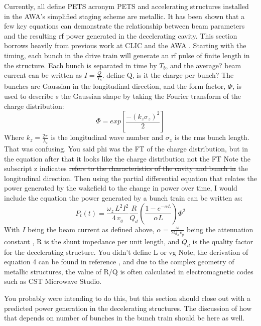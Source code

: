 \documentclass{iitthesis}
\newcommand{\lsnote}[1]{\textsf{{\color{violet}{ LS note:}   #1 }}}
\begin{document}
Currently, all \lsnote{define PETS acronym} PETS and accelerating structures installed in the AWA's
simplified staging scheme are metallic. It has been shown that a few
key equations can demonstrate the relationship between beam parameters
and the resulting \lsnote{\sout{rf} power} generated in the decelerating cavity. This section
borrows heavily from previous work at CLIC and the AWA \cite{key-3,key-8}. 
Starting with the timing, each bunch in the drive train will generate
an rf pulse of finite length in the structure. Each bunch is separated
in time by $T_{b}$, and the \lsnote{average?} beam current can be written as $I=\frac{Q}{T_{b}}$.
\lsnote{define Q, is it the charge per bunch?} The bunches are Gaussian in the longitudinal direction, and the form
factor, $\Phi$, is used to describe\lsnote{\sout{s}} the Gaussian shape by taking
the Fourier transform of the charge distribution: 
\begin{equation}
\Phi=exp\left[\frac{-(k_{z}\sigma_{z})^{2}}{2}\right]
\end{equation}
Where $k_{z}=\frac{2\pi}{\lambda_{z}}$ is the longitudinal wave number
and $\sigma_{z}$ is the rms bunch length. \lsnote{That was confusing.  You said phi was the FT of the charge distribution, but in the equation after that it looks like the charge distribution not the FT}  Note the subscript z \lsnote{indicates \sout{refers to the characteristics of the cavity and bunch in}} the longitudinal
direction. Then using the partial differential equation that relates
the power generated by the wakefield to the change in power over time, \lsnote{I would include the equation}
the power generated by a bunch train can be written as:
\begin{equation} \label{eq:rfpower}
P_{t}(t)=\frac{\omega_{z}\,L^{2}I^{2}}{4\,v_{g}}\frac{R}{Q_{d}}\left(\frac{1-e^{-\alpha L}}{\alpha L}\right)\Phi^{2}
\end{equation}
With $I$ being the beam current as defined above, $\alpha=\frac{\omega}{2Q_{d}v_{g}}$
being the attenuation constant \cite{key-9}, R is the shunt impedance
per unit length, and $Q_{d}$ is the quality factor for the decelerating
structure. \lsnote{You didn't define L or vg} Note, the derivation of equation 4 can be found in reference
\cite{key-8}, and due to the complex geometry of metallic structures,
the value of R/Q is often calculated in electromagnetic codes such
as CST Microwave Studio. 

\lsnote{You probably were intending to do this, but this section should close out with a predicted power generation 
in the decelerating structures.  The discussion of how that depends on number of bunches in the bunch train should be here as well.}
\end{document}
